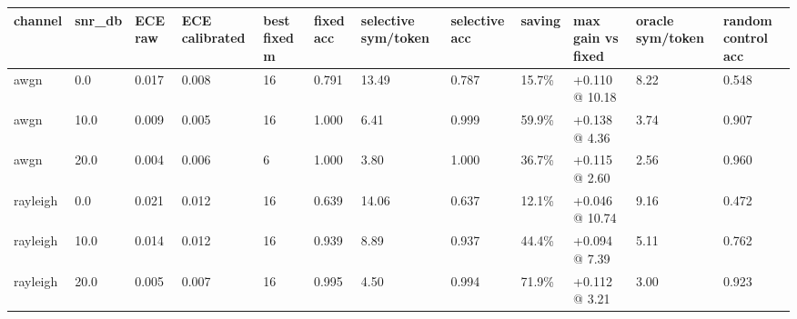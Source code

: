 \begin{tabular}{llllllllllll}
\hline
channel & snr\_db & ECE raw & ECE calibrated & best fixed m & fixed acc & selective sym/token & selective acc & saving & max gain vs fixed & oracle sym/token & random control acc \\
\hline
awgn & 0.0 & 0.017 & 0.008 & 16 & 0.791 & 13.49 & 0.787 & 15.7\% & +0.110 @ 10.18 & 8.22 & 0.548 \\
awgn & 10.0 & 0.009 & 0.005 & 16 & 1.000 & 6.41 & 0.999 & 59.9\% & +0.138 @ 4.36 & 3.74 & 0.907 \\
awgn & 20.0 & 0.004 & 0.006 & 6 & 1.000 & 3.80 & 1.000 & 36.7\% & +0.115 @ 2.60 & 2.56 & 0.960 \\
rayleigh & 0.0 & 0.021 & 0.012 & 16 & 0.639 & 14.06 & 0.637 & 12.1\% & +0.046 @ 10.74 & 9.16 & 0.472 \\
rayleigh & 10.0 & 0.014 & 0.012 & 16 & 0.939 & 8.89 & 0.937 & 44.4\% & +0.094 @ 7.39 & 5.11 & 0.762 \\
rayleigh & 20.0 & 0.005 & 0.007 & 16 & 0.995 & 4.50 & 0.994 & 71.9\% & +0.112 @ 3.21 & 3.00 & 0.923 \\
\hline
\end{tabular}
